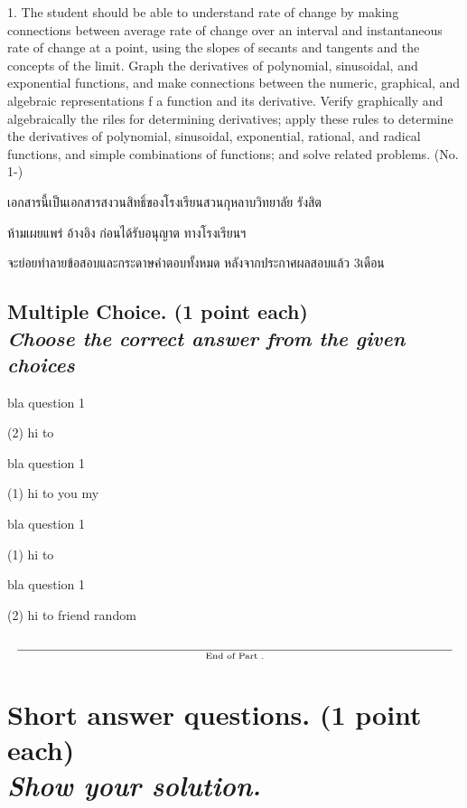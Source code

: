 \documentclass[noquestionbreak]{../skrexam}  %
\newcommand*\LearningOutCome{%
1.  The student should be able to understand rate of change by making connections between average rate of change over an interval and instantaneous rate of change at a point, using the slopes of secants and tangents and the concepts of the limit. Graph the derivatives of polynomial, sinusoidal, and exponential functions, and make connections between the numeric, graphical, and algebraic representations f a function and its derivative. Verify graphically and algebraically the riles for determining derivatives; apply these rules to determine the derivatives of polynomial, sinusoidal, exponential, rational, and radical functions, and simple combinations of functions; and solve related problems. (No. 1-\ntotalquestion)
}
\begin{document}
\begin{coverpages}
	\LearningOutCome
	

	\asteriskfill
	
	
	\begin{tcolorbox}[halign upper = center]
	
	เอกสารนี้เป็นเอกสารสงวนสิทธิ์ของโรงเรียนสวนกุหลาบวิทยาลัย รังสิต
	
	ห้ามเผยแพร่  อ้างอิง ก่อนได้รับอนุญาต  ทางโรงเรียนฯ 
	
	จะย่อยทำลายข้อสอบและกระดาษคำตอบทั้งหมด หลังจากประกาศผลสอบแล้ว 3เดือน

	\end{tcolorbox}
	
	\cleardoublepage

\end{coverpages}

\pagestyle{headandfoot}
\runningheader{}{\resizebox{\textwidth}{!}{\HeaderDescription}}{}
\runningfooter{}{}{}
\runningheadrule

\begin{questions}
\section{Multiple Choice. (1 point each)%
\protect\\%
\textit{\small Choose the correct answer from the given choices}%
}
\question
bla question 1
\begin{choices}(2)
	\choice hi
	\choice to
\end{choices}
\question
bla question 1
\begin{choices}(1)
	\choice hi
	\choice to
	\choice you
	\choice my
\end{choices}
\question
bla question 1
\begin{choices}(1)
	\choice hi
	\choice to
\end{choices}
\question
bla question 1
\begin{choices}(2)
	\choice hi
	\choice to
	\choice friend
	\choice random
\end{choices}
\end{questions}

\[
\underset{%
	\text{End of \thesection}%
	}{%
	\text{\underline{\hspace{\textwidth}}}%
}
\]


\newpage
\section{Short answer questions. (1 point each)%
\protect\\%
\textit{\small Show your solution.}%
}
\end{document}
